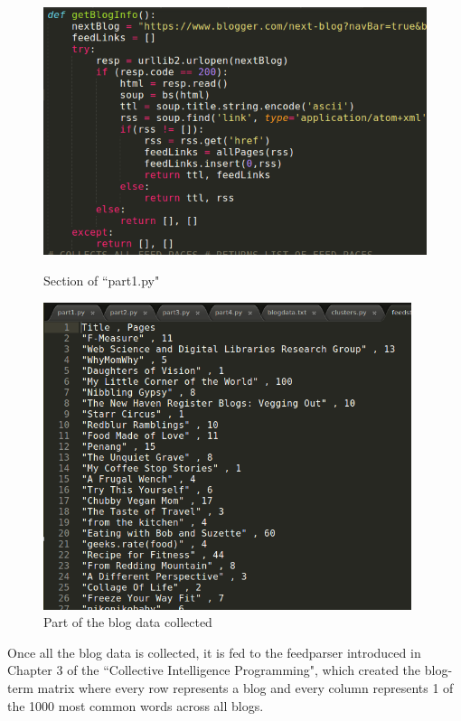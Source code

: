 \documentclass{article}
\begin{document}
\begin{figure}[H]
 \centering
 	\includegraphics[height=8cm]{P1.png}
  \caption{Section of ``part1.py"}
\end{figure}


\begin{figure}[H]
 \centering
 	\includegraphics[height=9cm]{feddstats.png}
  \caption{Part of the blog data collected}
\end{figure}

Once all the blog data is collected, it is fed to the feedparser introduced in Chapter 3 of the ``Collective Intelligence Programming", which created the blog-term matrix where every row represents a blog and every column represents 1 of the 1000 most common words across all blogs.



\end{document}
